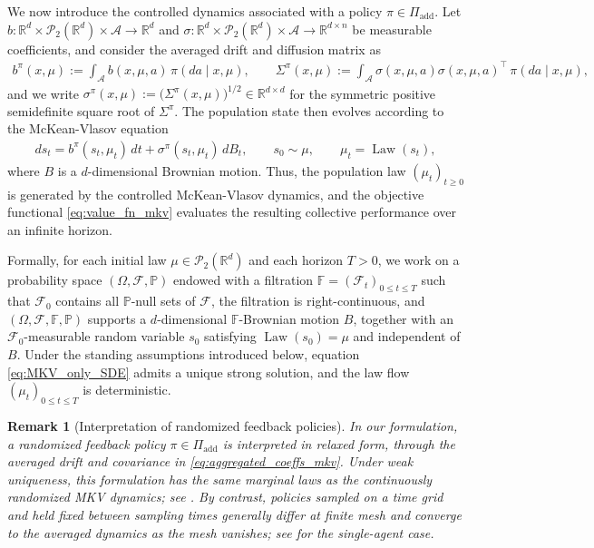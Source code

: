\documentclass[a4paper, 10pt, english, reqno]{amsart}
\DeclareMathOperator*{\Law}{\text{Law}}
\newtheorem{remark}[theorem]{Remark}
\begin{document}
We now introduce the controlled dynamics associated with a policy
$\pi\in\Pi_{\mathrm{add}}$. Let
$b:\mathbb R^d\times\mathcal P_2(\mathbb R^d)\times\mathcal A
\to\mathbb R^d$
and
$\sigma:\mathbb R^d\times\mathcal P_2(\mathbb R^d)\times\mathcal A
\to\mathbb R^{d\times n}$
be measurable coefficients, and consider the averaged drift and diffusion matrix
as
\begin{align}\label{eq:aggregated_coeffs_mkv}
  b^\pi(x,\mu)
  := \int_{\mathcal A} b(x,\mu,a)\,\pi(da\mid x,\mu),
  \qquad
  \Sigma^\pi(x,\mu)
  := \int_{\mathcal A}
  \sigma(x,\mu,a)\sigma(x,\mu,a)^\top\,\pi(da\mid x,\mu),
\end{align}
and we write
$\sigma^\pi(x,\mu):=\bigl(\Sigma^\pi(x,\mu)\bigr)^{1/2}
\in\mathbb R^{d\times d}$ for the symmetric positive semidefinite
square root of $\Sigma^\pi$. The population state then evolves
according to the McKean-Vlasov equation
\begin{align}\label{eq:MKV_only_SDE}
  ds_t
  = b^\pi(s_t,\mu_t)\,dt
  + \sigma^\pi(s_t,\mu_t)\,d B_t,
  \qquad
  s_0\sim\mu,
  \qquad
  \mu_t=\Law(s_t),
\end{align}
where $B$ is a $d$-dimensional Brownian motion. Thus, the
population law $(\mu_t)_{t\ge0}$ is generated by the controlled
McKean-Vlasov dynamics, and the objective functional
\eqref{eq:value_fn_mkv} evaluates the resulting collective
performance over an infinite horizon.

Formally, for each initial law $\mu\in\mathcal P_2(\mathbb R^d)$ and
each horizon $T>0$, we work on a probability space
$(\Omega,\mathcal F,\mathbb P)$ endowed with a filtration
$\mathbb F=(\mathcal F_t)_{0\le t\le T}$ such that $\mathcal F_0$
contains all $\mathbb P$-null sets of $\mathcal F$, the filtration is
right-continuous, and
$(\Omega,\mathcal F,\mathbb F,\mathbb P)$ supports a
$d$-dimensional $\mathbb F$-Brownian motion $B$, together with
an $\mathcal F_0$-measurable random variable $s_0$ satisfying
$\Law(s_0)=\mu$ and independent of $B$. Under the
standing assumptions introduced below, equation
\eqref{eq:MKV_only_SDE} admits a unique strong solution, and the law
flow $(\mu_t)_{0\le t\le T}$ is deterministic.




\begin{remark}[Interpretation of randomized feedback policies]\label{rem:randomized-feedback-interpretation}In our formulation, a randomized feedback policy $\pi\in\Pi_{\mathrm{add}}$ is interpreted in relaxed form, through the averaged drift and covariance in \eqref{eq:aggregated_coeffs_mkv}. Under weak uniqueness, this formulation has the same marginal laws as the continuously randomized MKV dynamics; see \cite{KarouiMeleard1990,Lacker,BayraktarCossoPham2018,Wei2023ContinuousTQ}. By contrast, policies sampled on a time grid and held fixed between sampling times generally differ at finite mesh and converge to the averaged dynamics as the mesh vanishes; see \cite{reconciling2026} for the single-agent case. 
\end{remark}
\end{document}
